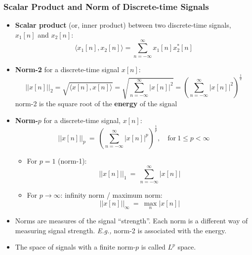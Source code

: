  \subsubsection{Scalar Product and Norm of Discrete-time Signals}
 \begin{itemize}
    \item \textbf{Scalar product} (or, inner product) between two discrete-time signals, $x_1[n]$ and $x_2[n]$:
    \[
        \langle x_{1}[n], x_{2}[n] \rangle = \sum_{n=-\infty}^{\infty} x_{1}[n] x_{2}^{*}[n]
    \]
    
    \item \textbf{Norm-2} for a discrete-time signal $x[n]$:
    \[
        \lvert \lvert x[n] \rvert \rvert_{2} 
        = \sqrt{\langle x[n], x[n] \rangle}
        = \sqrt{\sum_{n=-\infty}^{\infty} \lvert x[n] \rvert^{2}} 
        = \left( \sum_{n=-\infty}^{\infty} \lvert x[n] \rvert^{2} \right) ^{\frac{1}{2}}
    \]
    norm-2 is the square root of the \textbf{energy} of the signal
    
    \item \textbf{Norm-$p$} for a discrete-time signal, $x[n]$:
    \[
        \lvert \lvert x[n] \rvert \rvert_{p} \ 
        = \ \left( \sum_{n=-\infty}^{\infty} \lvert x[n] \rvert^{p} \right)^{\frac{1}{p}}, 
        \quad \text{for} \ 1 \leq p < \infty
    \]
    \begin{itemize}
        \item For $p=1$ (norm-1):
        \[
            \lvert \lvert x[n] \rvert \rvert_{1} \ 
            = \ \sum_{n=-\infty}^{\infty} \lvert x[n] \rvert 
        \]
        
        \item For $p \to \infty$: infinity norm / maximum norm:
        \[
            \lvert \lvert x[n] \rvert \rvert_{\infty} \ = \ \max_{n} \lvert x[n] \rvert 
        \] 
    \end{itemize}
    
    \item Norms are measures of the signal “strength”. Each norm is a different way of measuring signal strength. \textit{E.g.,} norm-2 is associated with the energy.
    
    \item The space of signals with a finite norm-$p$ is called $L^{p}$ space.
\end{itemize}
 
